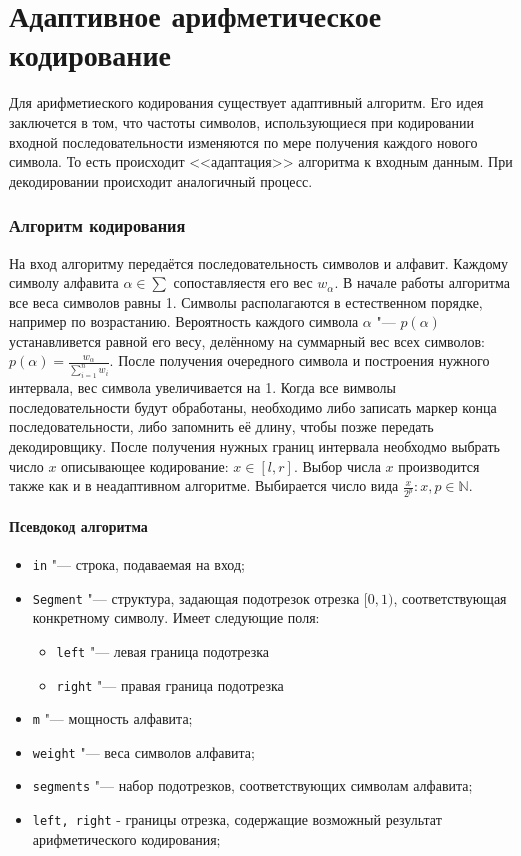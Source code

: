 \documentclass[12pt]{article}
\begin{document}
\part*{Адаптивное арифметическое кодирование}
Для арифметиеского кодирования существует адаптивный алгоритм. Его идея заключется в том, что частоты символов, использующиеся при кодировании входной последовательности изменяются по мере получения каждого нового символа. То есть происходит <<адаптация>> алгоритма к входным данным. При декодировании происходит аналогичный процесс.
\section*{Алгоритм кодирования}
На вход алгоритму передаётся последовательность символов и алфавит. Каждому символу алфавита $\alpha \in \sum $
сопоставляестя его вес 
$ w_\alpha $. В начале работы алгоритма все веса символов равны 1.
Символы располагаются в естественном порядке, например по возрастанию. Вероятность каждого символа $ \alpha $ "--- $ p(\alpha) $ устанавливется равной его весу, делённому на суммарный вес всех символов: $ p(\alpha) = \frac{w_\alpha}{\sum_{i=1}^n w_i} $. После получения очередного символа и построения нужного интервала, вес символа увеличивается на 1. Когда все вимволы последовательности будут обработаны, необходимо либо записать маркер конца последовательности, либо запомнить её длину, чтобы позже передать декодировщику. После получения нужных границ интервала необходмо выбрать число $ x $ описывающее кодирование:
$ x \in [l, r]$. Выбор числа $x$ производится также как и в неадаптивном алгоритме. Выбирается число вида $ \frac{x}{2^p}: x,p \in \mathbb N$.

\subsection*{Псевдокод алгоритма}

\begin{itemize}
	\item \verb'in' "--- строка, подаваемая на вход;
	\item \verb'Segment' "--- структура, задающая подотрезок отрезка $[0, 1)$, соответствующая конкретному символу.
   Имеет следующие поля:
   \begin{itemize}
		\item \verb'left' "--- левая граница подотрезка
		\item \verb'right' "--- правая граница подотрезка
	\end{itemize}
	\item \verb'm' "--- мощность алфавита;
   \item \verb'weight' "--- веса символов алфавита;
	\item \verb'segments' "--- набор подотрезков, соответствующих символам алфавита;
	\item \verb'left, right' - границы отрезка, содержащие возможный результат арифметического кодирования;
\end{itemize}
\end{document}
